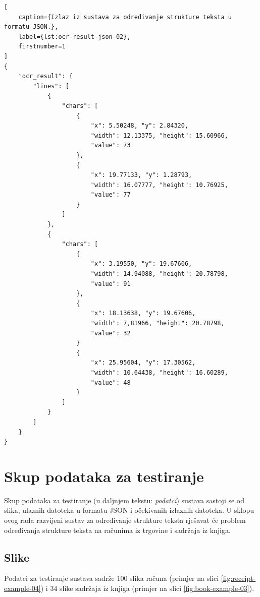 \documentclass[times, utf8, zavrsni]{fer}
\begin{document}
\begin{lstlisting}[
    caption={Izlaz iz sustava za određivanje strukture teksta u formatu JSON.},
    label={lst:ocr-result-json-02},
    firstnumber=1
]
{
    "ocr_result": {
        "lines": [
            {
                "chars": [
                    {
                        "x": 5.50248, "y": 2.84320,
                        "width": 12.13375, "height": 15.60966,
                        "value": 73
                    },
                    {
                        "x": 19.77133, "y": 1.28793,
                        "width": 16.07777, "height": 10.76925,
                        "value": 77
                    }
                ]
            },
            {
                "chars": [
                    {
                        "x": 3.19550, "y": 19.67606,
                        "width": 14.94088, "height": 20.78798,
                        "value": 91
                    },
                    {
                        "x": 18.13638, "y": 19.67606,
                        "width": 7,81966, "height": 20.78798,
                        "value": 32
                    }
                    {
                        "x": 25.95604, "y": 17.30562,
                        "width": 10.64438, "height": 16.60289,
                        "value": 48
                    }
                ]
            }
        ]
    }
}
\end{lstlisting}








\section{Skup podataka za testiranje}
\label{sec:skup-padataka-za-testiranje}
Skup podataka za testiranje (u daljnjem tekstu: \emph{podatci})
sustava sastoji se od slika, ulaznih datoteka u formatu JSON i
očekivanih izlaznih datoteka. U sklopu ovog rada razvijeni sustav za
određivanje strukture teksta rješavat će problem određivanja strukture teksta
na računima iz trgovine i sadržaja iz knjiga.




\subsection{Slike}
\label{subsec:slike}
Podatci za testiranje sustava sadrže $100$ slika računa (primjer na slici
\ref{fig:receipt-example-04}) i $34$ slike sadržaja iz knjiga (primjer na slici
\ref{fig:book-example-03}).
\end{document}
